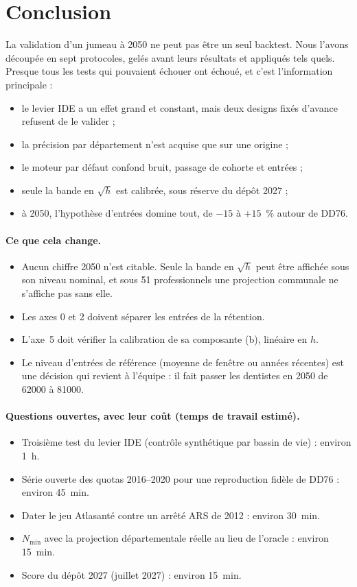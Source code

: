 \section{Conclusion}
La validation d'un jumeau à 2050 ne peut pas être un seul backtest. Nous l'avons découpée en sept
protocoles, gelés avant leurs résultats et appliqués tels quels. Presque tous les tests qui pouvaient
échouer ont échoué, et c'est l'information principale :
\begin{itemize}
  \item le levier IDE a un effet grand et constant, mais deux designs fixés d'avance refusent de le
        valider ;
  \item la précision par département n'est acquise que sur une origine ;
  \item le moteur par défaut confond bruit, passage de cohorte et entrées ;
  \item seule la bande en $\sqrt h$ est calibrée, sous réserve du dépôt 2027 ;
  \item à 2050, l'hypothèse d'entrées domine tout, de $-15$ à $+15$\mesure{}~\% autour de DD76.
\end{itemize}

\paragraph{Ce que cela change.}
\begin{itemize}
  \item Aucun chiffre 2050 n'est citable. Seule la bande en $\sqrt h$ peut être affichée sous son niveau
        nominal, et sous 51 professionnels une projection communale ne s'affiche pas sans elle.
  \item Les axes 0 et 2 doivent séparer les entrées de la rétention.
  \item L'axe~5 doit vérifier la calibration de sa composante (b), linéaire en $h$.
  \item Le niveau d'entrées de référence (moyenne de fenêtre ou années récentes) est une décision qui
        revient à l'équipe : il fait passer les dentistes en 2050 de \num{62000} à \num{81000}\mesure{}.
\end{itemize}

\paragraph{Questions ouvertes, avec leur coût (temps de travail estimé).}
\begin{itemize}
  \item Troisième test du levier IDE (contrôle synthétique par bassin de vie) : environ 1~h.
  \item Série ouverte des quotas 2016--2020 pour une reproduction fidèle de DD76 : environ 45~min.
  \item Dater le jeu Atlasanté contre un arrêté ARS de 2012 : environ 30~min.
  \item $N_{\min}$ avec la projection départementale réelle au lieu de l'oracle : environ 15~min.
  \item Score du dépôt 2027 (juillet 2027) : environ 15~min.
\end{itemize}



